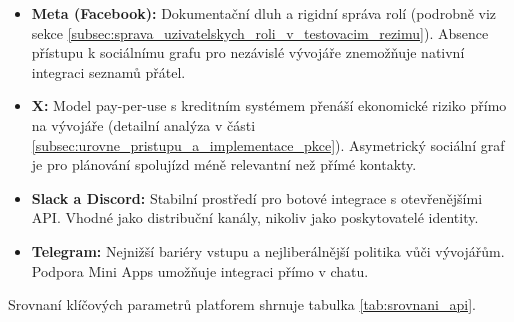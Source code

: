 \documentclass[male,czech,api_bc]{kitheses}
\begin{document}
\begin{itemize}
    \item \textbf{Meta (Facebook):} Dokumentační dluh a rigidní správa rolí (podrobně viz sekce \vref{subsec:sprava_uzivatelskych_roli_v_testovacim_rezimu}). Absence přístupu k sociálnímu grafu pro nezávislé vývojáře znemožňuje nativní integraci seznamů přátel.
    
    \item \textbf{X:} Model pay-per-use s kreditním systémem přenáší ekonomické riziko přímo na vývojáře (detailní analýza v části \vref{subsec:urovne_pristupu_a_implementace_pkce}). Asymetrický sociální graf je pro plánování spolujízd méně relevantní než přímé kontakty.
    
    \item \textbf{Slack a Discord:} Stabilní prostředí pro botové integrace s otevřenějšími API. Vhodné jako distribuční kanály, nikoliv jako poskytovatelé identity.
    
    \item \textbf{Telegram:} Nejnižší bariéry vstupu a nejliberálnější politika vůči vývojářům. Podpora Mini Apps umožňuje integraci přímo v chatu.
\end{itemize}

Srovnaní klíčových parametrů platforem shrnuje tabulka \vref{tab:srovnani_api}.
\end{document}
